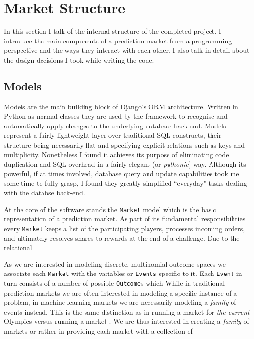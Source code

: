 \documentclass[bsc,frontabs,twoside,singlespacing,parskip,deptreport]{infthesis}     %
\begin{document}
\section{Market Structure}

In this section I talk of the internal structure of the completed project. I introduce the main components of a prediction market from a programming perspective and the ways they interact with each other. I also talk in detail about the design decisions I took while writing the code. 

\subsection{Models}
    Models are the main building block of Django's ORM architecture. Written in Python as normal classes they are used by the framework to recognise and automatically apply changes to the underlying database back-end. Models represent a fairly lightweight layer over traditional SQL constructs, their structure being necessarily flat and specifying explicit relations such as keys and multiplicity. Nonetheless I found it achieves its purpose of eliminating code duplication and SQL overhead in a fairly elegant (or {\em pythonic}) way. Although its powerful, if at times involved, database query and update capabilities took me some time to fully grasp, I found they greatly simplified ``everyday" tasks dealing with the databse back-end. 
    
    At the core of the software stands the {\tt Market} model which is the basic representation of a prediction market. As part of its fundamental responsibilities every {\tt Market} keeps a list of the participating players, processes incoming orders, and ultimately resolves shares to rewards at the end of a challenge. Due to the relational 
    
    
    As we are interested in modeling discrete, multinomial outcome spaces we associate each {\tt Market} with the variables or {\tt Events} specific to it. Each {\tt Event} in turn consists of a number of possible {\tt Outcome}s which 
    While in traditional prediction markets we are often interested in modeling a specific instance of a problem, in machine learning markets we are necessarily modeling a {\em family} of events instead. This is the same distinction as in running a market for {\em the current} Olympics  versus running a market . We are thus interested in creating a {\em family} of markets or rather in providing each market with a collection of 
    
\end{document}

